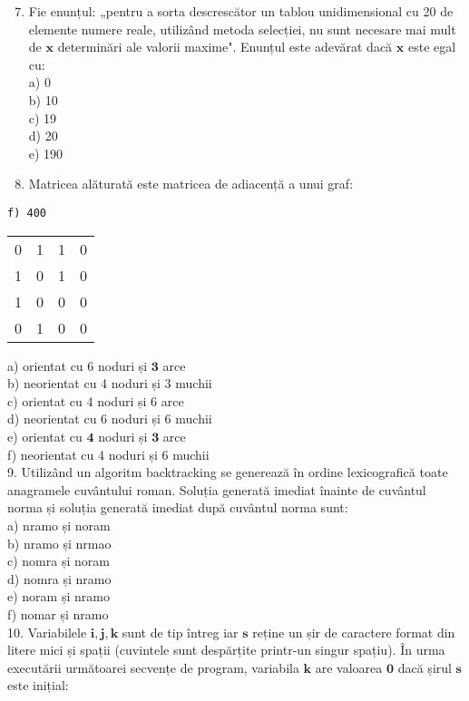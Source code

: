 \begin{enumerate}
  \setcounter{enumi}{6}
  \item Fie enunțul: „pentru a sorta descrescător un tablou unidimensional cu 20 de elemente numere reale, utilizând metoda selecției, nu sunt necesare mai mult de $\mathbf{x}$ determinări ale valorii maxime". Enunțul este adevărat dacă $\mathbf{x}$ este egal cu:\\
a) 0\\
b) 10\\
c) 19\\
d) 20\\
e) 190
  \item Matricea alăturată este matricea de adiacență a unui graf:
\end{enumerate}

\begin{verbatim}
f) 400
\end{verbatim}

\begin{center}
\begin{tabular}{llll}
0 & 1 & 1 & 0 \\
1 & 0 & 1 & 0 \\
1 & 0 & 0 & 0 \\
0 & 1 & 0 & 0 \\
\end{tabular}
\end{center}

a) orientat cu 6 noduri și $\mathbf{3}$ arce\\
b) neorientat cu 4 noduri și 3 muchii\\
c) orientat cu 4 noduri și 6 arce\\
d) neorientat cu 6 noduri și 6 muchii\\
e) orientat cu $\mathbf{4}$ noduri și $\mathbf{3}$ arce\\
f) neorientat cu 4 noduri și 6 muchii\\
9. Utilizând un algoritm backtracking se generează în ordine lexicografică toate anagramele cuvântului roman. Soluția generată imediat înainte de cuvântul norma și soluția generată imediat după cuvântul norma sunt:\\
a) nramo și noram\\
b) nramo și nrmao\\
c) nomra și noram\\
d) nomra și nramo\\
e) noram și nramo\\
f) nomar și nramo\\
10. Variabilele $\mathbf{i}, \mathbf{j}, \mathbf{k}$ sunt de tip întreg iar $\mathbf{s}$ reține un șir de caractere format din litere mici și spații (cuvintele sunt despărțite printr-un singur spațiu). În urma executării următoarei secvențe de program, variabila $\mathbf{k}$ are valoarea $\mathbf{0}$ dacă șirul $\mathbf{s}$ este inițial:

